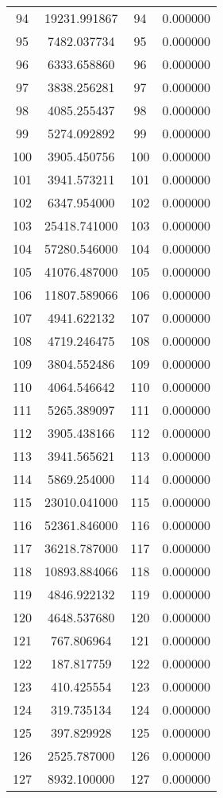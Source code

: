 \documentclass[12pt]{article}
\begin{document}
\begin{longtable}{@{}cccc@{}}
94 & 19231.991867 & 94 & 0.000000 \\
95 & 7482.037734 & 95 & 0.000000 \\
96 & 6333.658860 & 96 & 0.000000 \\
97 & 3838.256281 & 97 & 0.000000 \\
98 & 4085.255437 & 98 & 0.000000 \\
99 & 5274.092892 & 99 & 0.000000 \\
100 & 3905.450756 & 100 & 0.000000 \\
101 & 3941.573211 & 101 & 0.000000 \\
102 & 6347.954000 & 102 & 0.000000 \\
103 & 25418.741000 & 103 & 0.000000 \\
104 & 57280.546000 & 104 & 0.000000 \\
105 & 41076.487000 & 105 & 0.000000 \\
106 & 11807.589066 & 106 & 0.000000 \\
107 & 4941.622132 & 107 & 0.000000 \\
108 & 4719.246475 & 108 & 0.000000 \\
109 & 3804.552486 & 109 & 0.000000 \\
110 & 4064.546642 & 110 & 0.000000 \\
111 & 5265.389097 & 111 & 0.000000 \\
112 & 3905.438166 & 112 & 0.000000 \\
113 & 3941.565621 & 113 & 0.000000 \\
114 & 5869.254000 & 114 & 0.000000 \\
115 & 23010.041000 & 115 & 0.000000 \\
116 & 52361.846000 & 116 & 0.000000 \\
117 & 36218.787000 & 117 & 0.000000 \\
118 & 10893.884066 & 118 & 0.000000 \\
119 & 4846.922132 & 119 & 0.000000 \\
120 & 4648.537680 & 120 & 0.000000 \\
121 & 767.806964 & 121 & 0.000000 \\
122 & 187.817759 & 122 & 0.000000 \\
123 & 410.425554 & 123 & 0.000000 \\
124 & 319.735134 & 124 & 0.000000 \\
125 & 397.829928 & 125 & 0.000000 \\
126 & 2525.787000 & 126 & 0.000000 \\
127 & 8932.100000 & 127 & 0.000000 \\

\end{longtable}
\end{document}

